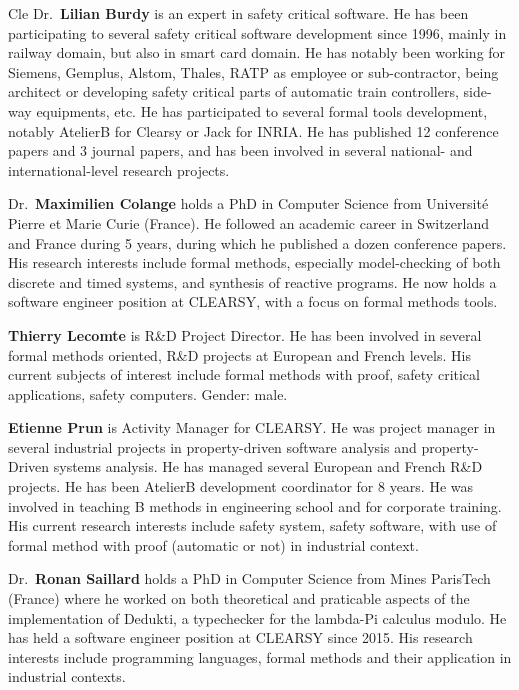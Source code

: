 \begin{sitedescription}{Cle}
Dr.\ \textbf{Lilian Burdy} is an expert in safety critical software. He has been participating to several safety critical software 
development since 1996, mainly in railway domain, but also in smart card domain. He has notably been working for Siemens, Gemplus, 
Alstom, Thales, RATP as employee or sub-contractor, being architect or developing safety critical parts of automatic train controllers, 
side-way equipments, etc. He has participated to several formal tools development, notably AtelierB for Clearsy or Jack for INRIA. He 
has published 12 conference papers and 3 journal papers, and has been involved in several national- and international-level research 
projects.

Dr.\ \textbf{Maximilien Colange} holds a PhD in Computer Science from Université Pierre et Marie Curie (France). He followed an 
academic career in Switzerland and France during 5 years, during which he published a dozen conference papers. His research interests
include formal methods, especially model-checking of both discrete and timed systems, and synthesis of reactive programs. He now holds 
a software engineer position at CLEARSY, with a focus on formal methods tools.

\textbf{Thierry Lecomte} is R\&D Project Director. He has been involved in several formal methods oriented, R\&D projects at European 
and French levels. His current subjects of interest include formal methods with proof, safety critical applications, safety computers. 
Gender: male.

\textbf{Etienne Prun} is Activity Manager for CLEARSY. He was project manager in several industrial projects in property-driven 
software analysis and property-Driven systems analysis. He has managed several European and French R&D projects. He has been AtelierB 
development coordinator for 8 years. He was involved in teaching B methods in engineering school and for corporate training. His current 
research interests include safety system, safety software, with use of formal method with proof (automatic or not) in industrial 
context.

Dr.\ \textbf{Ronan Saillard} holds a PhD in Computer Science from Mines ParisTech (France) where he worked on both theoretical and praticable 
aspects of the implementation of Dedukti, a typechecker for the lambda-Pi calculus modulo. He has held a software engineer position at 
CLEARSY since 2015. His research interests include programming languages, formal methods and their application in industrial contexts.


\end{sitedescription}
